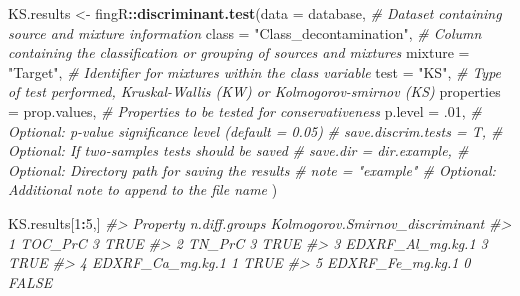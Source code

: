 \documentclass[
]{article}
\newenvironment{Shaded}{\begin{snugshade}}{\end{snugshade}}
\newcommand{\AttributeTok}[1]{\textcolor[rgb]{0.13,0.29,0.53}{#1}}
\newcommand{\CommentTok}[1]{\textcolor[rgb]{0.56,0.35,0.01}{\textit{#1}}}
\newcommand{\DecValTok}[1]{\textcolor[rgb]{0.00,0.00,0.81}{#1}}
\newcommand{\FunctionTok}[1]{\textcolor[rgb]{0.13,0.29,0.53}{\textbf{#1}}}
\newcommand{\NormalTok}[1]{#1}
\newcommand{\OtherTok}[1]{\textcolor[rgb]{0.56,0.35,0.01}{#1}}
\newcommand{\SpecialCharTok}[1]{\textcolor[rgb]{0.81,0.36,0.00}{\textbf{#1}}}
\newcommand{\StringTok}[1]{\textcolor[rgb]{0.31,0.60,0.02}{#1}}
\begin{document}
\begin{Shaded}
\begin{Highlighting}[]
\NormalTok{KS.results }\OtherTok{\textless{}{-}}\NormalTok{ fingR}\SpecialCharTok{::}\FunctionTok{discriminant.test}\NormalTok{(}\AttributeTok{data =}\NormalTok{ database,                 }\CommentTok{\# Dataset containing source and mixture information}
                                       \AttributeTok{class =} \StringTok{"Class\_decontamination"}\NormalTok{, }\CommentTok{\# Column containing the classification or grouping of sources and mixtures}
                                       \AttributeTok{mixture =} \StringTok{"Target"}\NormalTok{,              }\CommentTok{\# Identifier for mixtures within the class variable}
                                       \AttributeTok{test =} \StringTok{"KS"}\NormalTok{,                     }\CommentTok{\# Type of test performed, Kruskal{-}Wallis (KW) or Kolmogorov{-}smirnov (KS)}
                                       \AttributeTok{properties =}\NormalTok{ prop.values,        }\CommentTok{\# Properties to be tested for conservativeness}
                                       \AttributeTok{p.level =}\NormalTok{ .}\DecValTok{01}\NormalTok{,                   }\CommentTok{\# Optional: p{-}value significance level (default = 0.05)}
                                       \CommentTok{\# save.discrim.tests = T,        \# Optional: If two{-}samples tests should be saved}
                                       \CommentTok{\# save.dir = dir.example,        \# Optional: Directory path for saving the results}
                                       \CommentTok{\# note = "example"               \# Optional: Additional note to append to the file name}
\NormalTok{                                       )}
\end{Highlighting}
\end{Shaded}

\begin{Shaded}
\begin{Highlighting}[]
\NormalTok{KS.results[}\DecValTok{1}\SpecialCharTok{:}\DecValTok{5}\NormalTok{,]}
\CommentTok{\#\textgreater{}           Property n.diff.groups Kolmogorov.Smirnov\_discriminant}
\CommentTok{\#\textgreater{} 1          TOC\_PrC             3                            TRUE}
\CommentTok{\#\textgreater{} 2           TN\_PrC             3                            TRUE}
\CommentTok{\#\textgreater{} 3 EDXRF\_Al\_mg.kg.1             3                            TRUE}
\CommentTok{\#\textgreater{} 4 EDXRF\_Ca\_mg.kg.1             1                            TRUE}
\CommentTok{\#\textgreater{} 5 EDXRF\_Fe\_mg.kg.1             0                           FALSE}
\end{Highlighting}
\end{Shaded}
\end{document}
